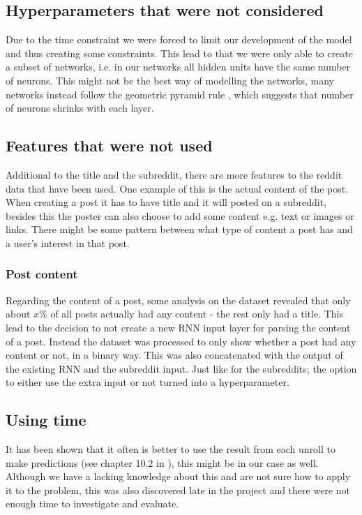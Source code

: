 \subsection{Hyperparameters that were not considered}
Due to the time constraint we were forced to limit our development of the model and thus creating some constraints. This lead to that we were only able to create a subset of networks, i.e. in our networks all hidden units have the same number of neurons. This might not be the best way of modelling the networks, many networks instead follow the geometric pyramid rule \parencite{masters1993practical}, which suggests that number of neurons shrinks with each layer.

\subsection{Features that were not used}
Additional to the title and the subreddit, there are more features to the reddit data that have been used. One example of this is the actual content of the post. When creating a post it has to have title and it will posted on a subreddit, besides this the poster can also choose to add some content e.g. text or images or links. There might be some pattern between what type of content a post has and a user's interest in that post.

\subsubsection{Post content}
Regarding the content of a post, some analysis on the dataset revealed that only about $x\%$ of all posts actually had any content - the rest only had a title. This lead to the decision to not create a new RNN input layer for parsing the content of a post. Instead the dataset was processed to only show whether a post had any content or not, in a binary way. This was also concatenated with the output of the existing RNN and the subreddit input. Just like for the subreddits; the option to either use the extra input or not turned into a hyperparameter.

\subsection{Using time}
It has been shown that it often is better to use the result from each unroll to make predictions (see chapter 10.2 in \parencite{Goodfellow-et-al-2016}), this might be in our case as well. Although we have a lacking knowledge about this and are not sure how to apply it to the problem, this was also discovered late in the project and there were not enough time to investigate and evaluate.

